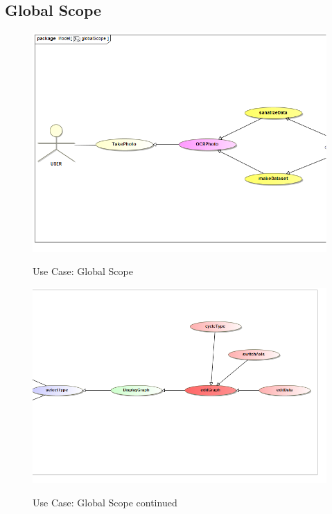 \documentclass[a4paper,12pt]{article}
\begin{document}
\subsection{Global Scope}
\begin{figure}[H]
		\includegraphics[width=\textwidth]{Images/globalScope.png}  \\
		\caption{Use Case: Global Scope}
	\end{figure}
	\begin{figure}[H]
		\includegraphics[width=\textwidth]{Images/globalscope2.png}  \\
		\caption{Use Case: Global Scope continued}
	\end{figure}
\end{document}
